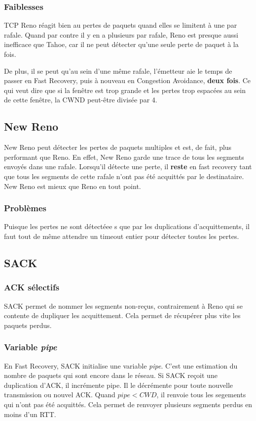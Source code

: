 \documentclass[	DIV=calc,%
							paper=a4,%
							fontsize=11pt,%
							twocolumn]{scrartcl}	 					%
\begin{document}
\subsubsection*{Faiblesses}
TCP Reno réagit bien au pertes de paquets quand elles se limitent à une par rafale. Quand par contre il y en a plusieurs par rafale, Reno est presque aussi inefficace que Tahoe, car il ne peut détecter qu'une seule perte de paquet à la fois.

De plus, il se peut qu'au sein d'une même rafale, l'émetteur aie le temps de passer en Fast Recovery, puis à nouveau en Congestion Avoidance, \textbf{deux fois}. Ce qui veut dire que si la fenêtre est trop grande et les pertes trop espacées au sein de cette fenêtre, la CWND peut-être divisée par 4.

\subsection*{New Reno}
New Reno peut détecter les pertes de paquets multiples et est, de fait, plus performant que Reno. En effet, New Reno garde une trace de tous les segments envoyés dans une rafale. Lorsqu'il détecte une perte, il \textbf{reste} en fast recovery tant que tous les segments de cette rafale n'ont pas été acquittés par le destinataire. New Reno est mieux que Reno en tout point.
\subsubsection*{Problèmes}
Puisque les pertes ne sont détectéee s que par les duplications d'acquittements, il faut tout de même attendre un timeout entier pour détecter toutes les pertes. 
\subsection*{SACK}
\subsubsection*{ACK sélectifs}
SACK permet de nommer les segments non-reçus, contrairement à Reno qui se contente de dupliquer les acquittement. Cela permet de récupérer plus vite les paquets perdus.
\subsubsection*{Variable \textit{pipe}}
En Fast Recovery, SACK initialise une variable \textit{pipe}. C'est une estimation du nombre de paquets qui sont encore dans le réseau. Si SACK reçoit une duplication d'ACK, il incrémente pipe. Il le décrémente pour toute nouvelle transmission ou nouvel ACK. Quand $ pipe < CWD$, il renvoie tous les segements qui n'ont pas été acquittés. Cela permet de renvoyer plusieurs segments perdus en moins d'un RTT.
\end{document}

